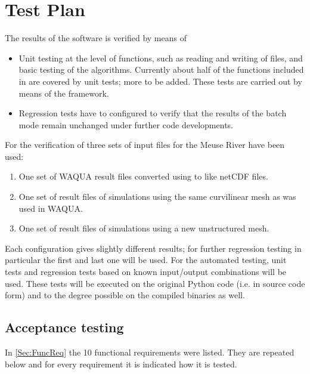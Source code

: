 \chapter{Test Plan} \label{Chp:TestPlan}

The results of the software is verified by means of

\begin{itemize}
\item Unit testing at the level of functions, such as reading and writing of files, and basic testing of the algorithms.
Currently about half of the functions included in  are covered by unit tests; more to be added.
These tests are carried out by means of the  framework.
\item Regression tests have to configured to verify that the results of the batch mode remain unchanged under further code developments.
\end{itemize}

For the verification of \dfastbe three sets of input files for the Meuse River have been used:

\begin{enumerate}
\item One set of WAQUA result files converted using  to \dflowfm like netCDF files.
\item One set of \dflowfm result files of simulations using the same curvilinear mesh as was used in WAQUA.
\item One set of \dflowfm result files of simulations using a new unstructured mesh.
\end{enumerate}

Each configuration gives slightly different results; for further regression testing in particular the first and last one will be used.
For the automated testing, unit tests and regression tests based on known input/output combinations will be used.
These tests will be executed on the original Python code (i.e. in source code form) and to the degree possible on the compiled binaries as well.

\section{Acceptance testing}

In \autoref{Sec:FuncReq} the 10 functional requirements were listed.
They are repeated below and for every requirement it is indicated how it is tested.


